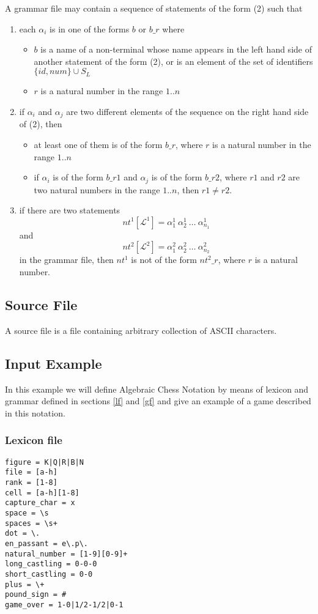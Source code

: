 \documentclass[a4paper,10pt]{article}
\begin{document}
A grammar file may contain a sequence of statements of the form (2) such that
\begin{enumerate}
\item each $\alpha_i$ is in one of the forms $b$ or $b\_r$ where 
\begin{itemize}
\item $b$ is a name of a non-terminal whose name appears in the left hand side of another statement of the form (2), or is an element of the set of identifiers $\{id,num\}\cup S_L$
\item $r$ is a natural number in the range $1..n$
\end{itemize}
\item if $\alpha_i$ and $\alpha_j$ are two different elements of the sequence on the right hand side of (2), then 
\begin{itemize}
\item at least one of them is of the form $b\_r$, where $r$ is a natural number in the range $1..n$
\item if $\alpha_i$ is of the form $b\_{r1}$ and $\alpha_j$ is of the form $b\_{r2}$, where $r1$ and $r2$ are two natural numbers in the range $1..n$, then $r1 \not= r2$.
\end{itemize} 
\item if there are two statements 
$$ nt^1[\mathcal{L^1}] = \alpha_1^1~\alpha_2^1~\ldots~\alpha_{n_1}^1  $$
and
$$ nt^2[\mathcal{L^2}] = \alpha_1^2~\alpha_2^2~\ldots~\alpha_{n_2}^2  $$
in the grammar file, then $nt^1$ is not of the form $nt^2\_r$, where $r$ is a natural number.
\end{enumerate}
 




\subsection{Source File}\label{sf}
A source file is a file containing arbitrary collection of ASCII characters.

\subsection{Input Example}\label{ie} 
In this example we will define Algebraic Chess Notation \cite{chess} by means of lexicon and grammar defined in sections \ref{lf} and \ref{gf} and give an example of a game described in this notation. 
\subsubsection{Lexicon file}
\begin{verbatim}
figure = K|Q|R|B|N
file = [a-h]
rank = [1-8]
cell = [a-h][1-8]
capture_char = x
space = \s
spaces = \s+
dot = \.
en_passant = e\.p\.
natural_number = [1-9][0-9]+
long_castling = 0-0-0
short_castling = 0-0
plus = \+
pound_sign = #
game_over = 1-0|1/2-1/2|0-1
\end{verbatim}
\end{document}
